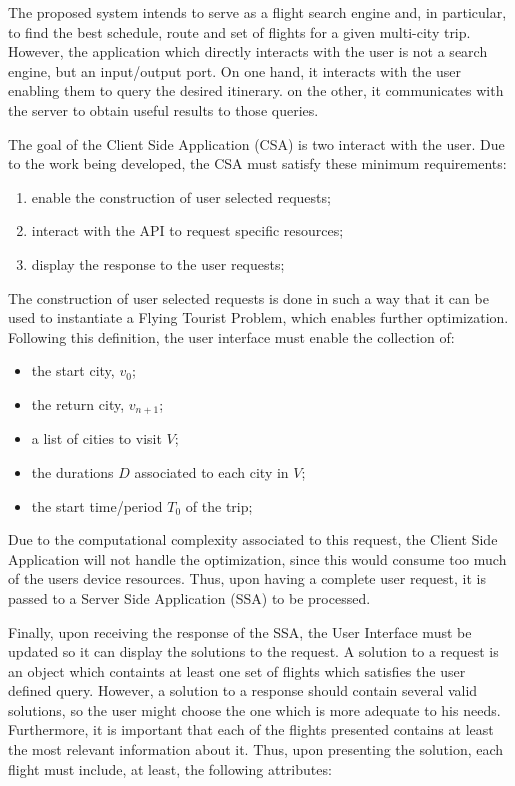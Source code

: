 

The proposed system intends to serve as a flight search engine and, in particular, to find the best schedule, route and set of flights for a given multi-city trip.
However, the application which directly interacts with the user is not a search engine, but an input/output port. On one hand, it interacts with the user enabling them to query the desired itinerary. on the other, it communicates with the server to obtain useful results to those queries. 


The goal of the Client Side Application (CSA) is two interact with the user.
Due to the work being developed, the CSA must satisfy these minimum requirements:

\begin{enumerate}[noitemsep,topsep=0pt,parsep=0pt,partopsep=0pt]
  \item enable the construction of user selected requests;
  \item interact with the API to request specific resources;
  \item display the response to the user requests;
\end{enumerate}

The construction of user selected requests is done in such a way 
that it can be used to instantiate a Flying Tourist Problem,
which enables further optimization.
Following this definition, the user interface must enable the collection of:

\begin{itemize}[noitemsep,topsep=0pt,parsep=0pt,partopsep=0pt]
  \item the start city, $v_{0}$;
  \item the return city, $v_{n+1}$;
  \item a list of cities to visit $V$;
  \item the durations $D$ associated to each city in $V$;
  \item the start time/period $T_{0}$ of the trip;
\end{itemize}

Due to the computational complexity associated to this request,
the Client Side Application will not handle the optimization,
since this would consume too much of the users device resources.
Thus, upon having a complete user request, it is passed to a 
Server Side Application (SSA) to be processed.

Finally, upon receiving the response of the SSA, 
the User Interface must be updated so it can display the solutions to the request.
A solution to a request is an object which containts at least one set of flights which 
satisfies the user defined query. However, a solution to a response should 
contain several valid solutions, so the user might choose the one which is more adequate to his needs.
Furthermore, it is important that each of the flights presented contains at least the most relevant information about it.
Thus, upon presenting the solution, each flight must include, at least, the following attributes:


